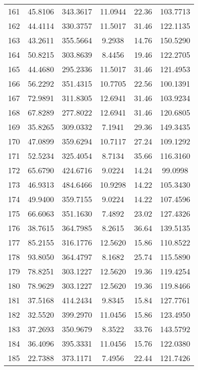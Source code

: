 \begin{center}
\begin{footnotesize}
\begin{tabular}{|c|ccccc|}
161 & 45.8106 & 343.3617 & 11.0944 & 22.36 & 103.7713 \\
162 & 44.4114 & 330.3757 & 11.5017 & 31.46 & 122.1135 \\
163 & 43.2611 & 355.5664 & 9.2938 & 14.76 & 150.5290 \\
164 & 50.8215 & 303.8639 & 8.4456 & 19.46 & 122.2705 \\
165 & 44.4680 & 295.2336 & 11.5017 & 31.46 & 121.4953 \\
166 & 56.2292 & 351.4315 & 10.7705 & 22.56 & 100.1391 \\
167 & 72.9891 & 311.8305 & 12.6941 & 31.46 & 103.9234 \\
168 & 67.8289 & 277.8022 & 12.6941 & 31.46 & 120.6805 \\
169 & 35.8265 & 309.0332 & 7.1941 & 29.36 & 149.3435 \\
170 & 47.0899 & 359.6294 & 10.7117 & 27.24 & 109.1292 \\
171 & 52.5234 & 325.4054 & 8.7134 & 35.66 & 116.3160 \\
172 & 65.6790 & 424.6716 & 9.0224 & 14.24 & 99.0998 \\
173 & 46.9313 & 484.6466 & 10.9298 & 14.22 & 105.3430 \\
174 & 49.9400 & 359.7155 & 9.0224 & 14.22 & 107.4596 \\
175 & 66.6063 & 351.1630 & 7.4892 & 23.02 & 127.4326 \\
176 & 38.7615 & 364.7985 & 8.2615 & 36.64 & 139.5135 \\
177 & 85.2155 & 316.1776 & 12.5620 & 15.86 & 110.8522 \\
178 & 93.8050 & 364.4797 & 8.1682 & 25.74 & 115.5890 \\
179 & 78.8251 & 303.1227 & 12.5620 & 19.36 & 119.4254 \\
180 & 78.9629 & 303.1227 & 12.5620 & 19.36 & 119.8466 \\
181 & 37.5168 & 414.2434 & 9.8345 & 15.84 & 127.7761 \\
182 & 32.5520 & 399.2970 & 11.0456 & 15.86 & 123.4950 \\
183 & 37.2693 & 350.9679 & 8.3522 & 33.76 & 143.5792 \\
184 & 36.4096 & 395.3331 & 11.0456 & 15.76 & 122.0380 \\
185 & 22.7388 & 373.1171 & 7.4956 & 22.44 & 121.7426 \\
\hline
\end{tabular}
\end{footnotesize}
\end{center}

